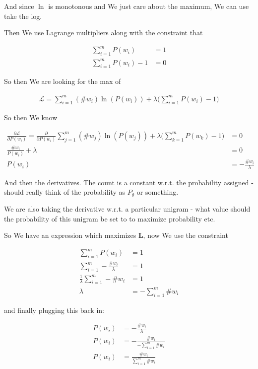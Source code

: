 \documentclass{article}
\begin{document}
		And since $\ln$ is monotonous and We just care about the maximum, We can use take the log.
		
		Then We use Lagrange multipliers along with the constraint that 
		
		\begin{align}
			\sum^m_{i=1} P(w_i) &= 1\\
			\sum^m_{i=1} P(w_i)-1 &= 0
		\end{align}
		
		So then We are looking for the max of 
		
		\begin{align}
			\mathcal{L}	= \sum^m_{i=1} (\#w_i)\ln (P(w_i)) + \lambda\bigg( \sum^m_{i=1} P(w_i) - 1 \bigg)
		\end{align}
		
		So then We know
		
		\begin{align}
			\frac{\partial \mathcal{L}}{\partial P(w_i)}	= \frac{\partial }{\partial P(w_i)} \sum^m_{j=1} (\#w_j)\ln (P(w_j)) + \lambda\bigg( \sum^m_{k=1} P(w_k) - 1 \bigg) &= 0\\
			\frac{\#w_i}{P(w_i)} + \lambda &= 0\\
			P(w_i)&= -\frac{\#w_i}{\lambda} 
		\end{align}
		
		And then the derivatives. The count is a constant w.r.t. the probability assigned - should really think of the probability as $P_\theta$ or something.
		
		We are also taking the derivative w.r.t. a particular unigram - what value should the probability of this unigram be set to to maximize probability etc.
		
		So We have an expression which maximizes $\mathbf{L}$, now We use the constraint 
		
		\begin{align}
			\sum^m_{i=1} P(w_i) &= 1\\
			\sum^m_{i=1} -\frac{\#w_i}{\lambda}  &= 1\\
			\frac{1}{\lambda}\sum^m_{i=1} -\#w_i  &= 1\\
			\lambda &= -\sum^m_{i=1} \#w_i
		\end{align}
		
		and finally plugging this back in:
		
		\begin{align}
			P(w_i)&= -\frac{\#w_i}{\lambda} \\
			P(w_i)&= -\frac{\#w_i}{-\sum^m_{i=1} \#w_i}\\
			P(w_i)&= \frac{\#w_i}{\sum^m_{i=1} \#w_i}
		\end{align}
		
\end{document}
